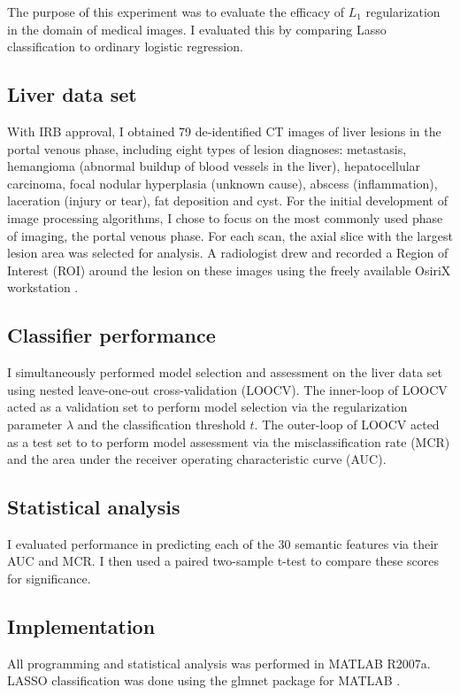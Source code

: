 The purpose of this experiment was to evaluate the efficacy of $L_1$ regularization in the domain of medical images. I evaluated this by comparing Lasso classification to ordinary logistic regression.

\subsection{Liver data set}
With IRB approval, I obtained 79 de-identified CT images of liver lesions in the portal venous phase, including eight types of lesion diagnoses: metastasis, hemangioma (abnormal buildup of blood vessels in the liver), hepatocellular carcinoma, focal nodular hyperplasia (unknown cause), abscess (inflammation), laceration (injury or tear), fat deposition and cyst. For the initial development of image processing algorithms, I chose to focus on the most commonly used phase of imaging, the portal venous phase. For each scan, the axial slice with the largest lesion area was selected for analysis. A radiologist drew and recorded a Region of Interest (ROI) around the lesion on these images using the freely available OsiriX workstation \cite{Armato:2007ks,Rosset:2004kk}.

\subsection{Classifier performance}
I simultaneously performed model selection and assessment on the liver data set using nested leave-one-out cross-validation (LOOCV). The inner-loop of LOOCV acted as a validation set to perform model selection via the regularization parameter $\lambda$ and the classification threshold $t$. The outer-loop of LOOCV acted as a test set to to perform model assessment via the misclassification rate (MCR) and the area under the receiver operating characteristic curve (AUC).

\subsection{Statistical analysis}
I evaluated performance in predicting each of the 30 semantic features via their AUC and MCR. I then used a paired two-sample t-test to compare these scores for significance. 

\subsection{Implementation}
All programming and statistical analysis was performed in MATLAB R2007a. LASSO classification was done using the glmnet package for MATLAB \cite{Friedman:2009wm}.